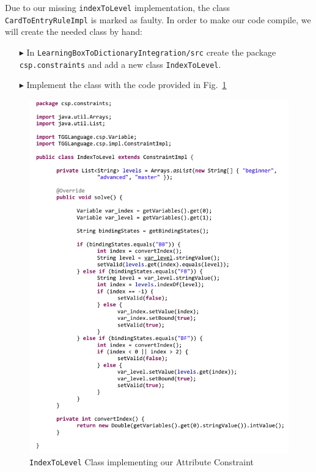 Due to our missing \texttt{indexToLevel} implementation, the class \texttt{Card\-To\-Entry\-Rule\-Impl} is marked as faulty.
In order to make our code compile, we will create the needed class by hand:

\begin{enumerate}
\item[$\blacktriangleright$] In \texttt{LearningBox\-To\-Dictionary\-Integration/src} create the package \texttt{csp.constraints} and add a new class \texttt{IndexToLevel}.
\item[$\blacktriangleright$] Implement the class with the code provided in Fig.~\ref{fig:indexToLevel}
\end{enumerate}

\begin{figure}[htbp]
\begin{center}
  \includegraphics[width=\textwidth]{pics/tggBilder/transformation/tgg23}
  \caption{\texttt{IndexToLevel} Class implementing our Attribute Constraint}  
  \label{fig:indexToLevel}
\end{center}
\end{figure} 

